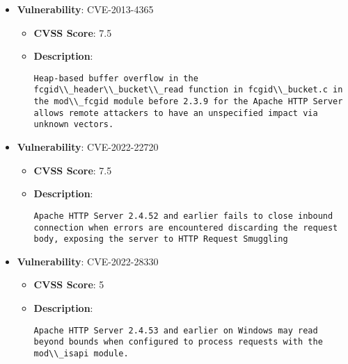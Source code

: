 \documentclass{article}
\begin{document}
\begin{itemize}
\begin{itemize}
{Special characters in the origin response header can truncate/split the response forwarded to the client.


|
            }
        \end{itemize}
    
        \item \textbf{Vulnerability}: CVE-2013-4365
        \begin{itemize}
            \item \textbf{CVSS Score}:  7.5 
            \item \textbf{Description}:
            \parbox[t]{0.9\linewidth}{
                \verb|Heap-based buffer overflow in the fcgid\\_header\\_bucket\\_read function in fcgid\\_bucket.c in the mod\\_fcgid module before 2.3.9 for the Apache HTTP Server allows remote attackers to have an unspecified impact via unknown vectors.|
            }
        \end{itemize}
    
        \item \textbf{Vulnerability}: CVE-2022-22720
        \begin{itemize}
            \item \textbf{CVSS Score}:  7.5 
            \item \textbf{Description}:
            \parbox[t]{0.9\linewidth}{
                \verb|Apache HTTP Server 2.4.52 and earlier fails to close inbound connection when errors are encountered discarding the request body, exposing the server to HTTP Request Smuggling|
            }
        \end{itemize}
    
        \item \textbf{Vulnerability}: CVE-2022-28330
        \begin{itemize}
            \item \textbf{CVSS Score}:  5 
            \item \textbf{Description}:
            \parbox[t]{0.9\linewidth}{
                \verb|Apache HTTP Server 2.4.53 and earlier on Windows may read beyond bounds when configured to process requests with the mod\\_isapi module.|
            }
        \end{itemize}
    

\end{itemize}
\end{document}
